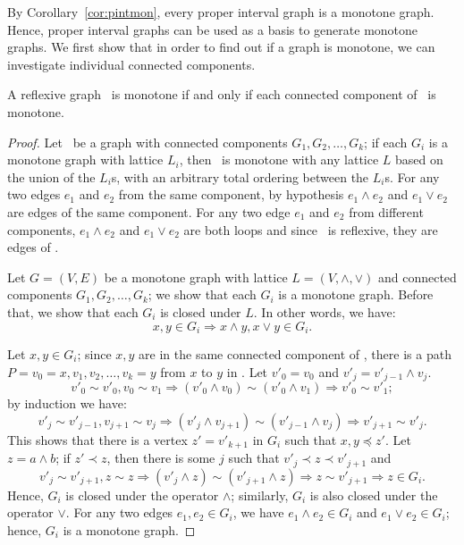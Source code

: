 By Corollary~\ref{cor:pintmon}, every proper interval graph is a monotone graph.
Hence, proper interval graphs can be used as a basis to generate monotone graphs.
We first show that in order to find out if a graph is monotone, we can 
investigate individual connected components.

\begin{lemma} \label{lem:monotone:con}
A reflexive graph \mG\ is monotone if and only if each connected component of \mG\ is monotone.
\end{lemma}

\begin{proof}
Let \mG\  be a graph with connected components \(G_1,G_2,\dotsc,G_k\);
if each \(G_i\) is a monotone graph with lattice \(L_i\),
then \mG\ is monotone with any lattice \(L\) based on the union of the \(L_i\)s, with
an arbitrary total ordering between the \(L_i\)s\@.
For any two edges \(e_1\) and \(e_2\) from the same component,
by hypothesis \(e_1\wedge e_2\) and \(e_1\vee e_2\) are
edges of the same component.
For any two edge \(e_1\) and \(e_2\) from different components,
\(e_1\wedge e_2\) and \(e_1\vee e_2\) are both loops and since \mG\ is reflexive,
they are edges of \mG\@.

Let \(G=(V,E)\) be a monotone graph with lattice \(L=(V,\wedge,\vee)\) and connected components \(G_1,G_2,\dotsc,G_k\);
we show that each \(G_i\) is a monotone graph. Before that, we show that each \(G_i\) is closed under \(L\)\@.
In other words, we have: \[x,y\in G_i \Rightarrow x\wedge y, x\vee y \in G_i.\]

Let \(x, y\in G_i\);
since \(x,y\) are in the same connected component of \mG, there is a path \(P=v_0=x,v_1,v_2,\dotsc,v_k=y\)
from \(x\) to \(y\) in \mG\@. Let \(v'_0 = v_0\) and \(v'_j = v'_{j-1} \wedge v_j\)\@.
\[v'_0 \sim v'_0, v_0\sim v_1 \Rightarrow (v'_0 \wedge v_0) \sim (v'_0 \wedge v_1) \Rightarrow v'_0 \sim v'_1;\]
by induction we have:
\[v'_j \sim v'_{j-1}, v_{j+1} \sim v_j \Rightarrow (v'_j \wedge v_{j+1}) \sim (v'_{j-1} \wedge v_j) \Rightarrow v'_{j+1} \sim v'_j.\]
This shows that there is a vertex \(z'=v'_{k+1}\) in \(G_i\) such that \(x,y\preceq z'\)\@.
Let \(z = a\wedge b\); if \(z' \prec z\), then there is some \(j\) such that \(v'_j \prec z \prec v'_{j+1}\) and 
\[v'_j\sim v'_{j+1}, z \sim z \Rightarrow (v'_j \wedge z) \sim (v'_{j+1} \wedge z) \Rightarrow z \sim v'_{j+1} \Rightarrow z \in G_i.\]
Hence, \(G_i\) is closed under the operator \(\wedge\); similarly, \(G_i\) is also closed under the operator \(\vee\).
For any two edges \(e_1,e_2\in G_i\), we have \(e_1\wedge e_2\in G_i\) and \(e_1\vee e_2 \in G_i\); hence, \(G_i\) is a monotone graph.
\end{proof}

